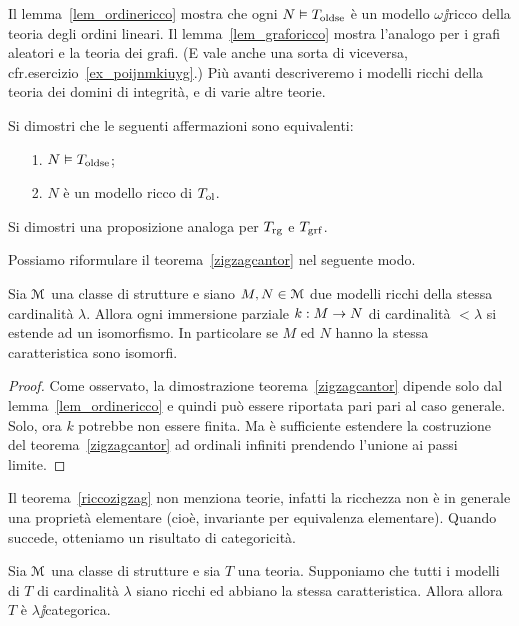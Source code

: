 Il lemma~\ref{lem_ordinericco} mostra che ogni $N\models T_{\rm oldse}$ \`e un modello $\omega\jj$ricco della teoria degli ordini lineari. Il lemma~\ref{lem_graforicco} mostra l'analogo per i grafi aleatori e la teoria dei grafi. (E vale anche una sorta di viceversa, cfr.\@ esercizio~\ref{ex_poijnmkiuyg}.) Pi\`u avanti descriveremo i modelli ricchi della teoria dei domini di integrit\`a, e di varie altre teorie.

\begin{exercise}\label{ex_poijnmkiuyg}
Si dimostri che le seguenti affermazioni sono equivalenti:
\begin{itemize}
\item[1.] $N\models T_{\rm oldse}$;
\item[2.] $N$ \`e un modello ricco di $T_{\rm ol}$.
\end{itemize}
Si dimostri una proposizione analoga per $T_{\rm rg}$ e $T_{\rm grf}$.\QED
\end{exercise}



Possiamo riformulare il teorema~\ref{zigzagcantor} nel seguente modo.

\begin{theorem}\label{riccozigzag}
Sia $\M$ una classe di strutture e siano $M, N\in\M$ due modelli ricchi della stessa cardinalit\`a $\lambda$. Allora ogni immersione parziale $k:M\imp N$ di cardinalit\`a $<\lambda$ si estende ad un isomorfismo. In particolare se $M$ ed $N$ hanno la stessa caratteristica sono isomorfi.
\end{theorem}

\begin{proof}
Come osservato, la dimostrazione teorema~\ref{zigzagcantor} dipende solo dal lemma~\ref{lem_ordinericco} e quindi pu\`o essere riportata pari pari al caso generale. Solo, ora $k$ potrebbe non essere finita. Ma \`e sufficiente estendere la costruzione del teorema~\ref{zigzagcantor} ad ordinali infiniti prendendo l'unione ai passi limite. 
\end{proof}

Il teorema~\ref{riccozigzag} non menziona teorie, infatti la ricchezza non \`e in generale una propriet\`a elementare (cio\`e, invariante per equivalenza elementare). Quando succede, otteniamo un risultato di categoricit\`a. 

\begin{corollary}
Sia $\M$ una classe di strutture e sia $T$ una teoria. Supponiamo che tutti i modelli di $T$ di cardinalit\`a $\lambda$ siano ricchi ed abbiano la stessa caratteristica. Allora allora $T$ \`e $\lambda\jj$categorica.\QED
\end{corollary}

